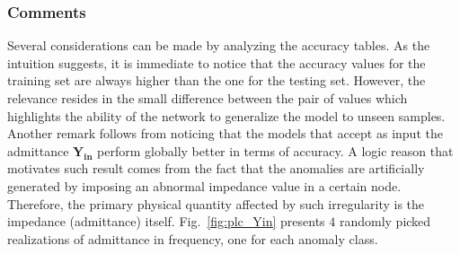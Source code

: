\begin{table}[h]
\begin{center}
\caption{Detection accuracy for $\mathbf{H}$ with constant and variable load impedances.}
\label{tab:plc_performances3}
\end{center}
\end{table}

\subsubsection{Comments}
\label{subsec:plc_comments}
Several considerations can be made by analyzing the accuracy tables. As the intuition suggests, it is immediate to notice that the accuracy values for the training set are always higher than the one for the testing set. However, the relevance resides in the small difference between the pair of values which highlights the ability of the network to generalize the model to unseen samples.
Another remark follows from noticing that the models that accept as input the admittance $\mathbf{Y_{\text{in}}}$ perform globally better in terms of accuracy. A logic reason that motivates such result comes from the fact that the anomalies are artificially generated by imposing an abnormal impedance value in a certain node. Therefore, the primary physical quantity affected by such irregularity is the impedance (admittance) itself. Fig.~\ref{fig:plc_Yin} presents $4$ randomly picked realizations of admittance in frequency, one for each anomaly class.


